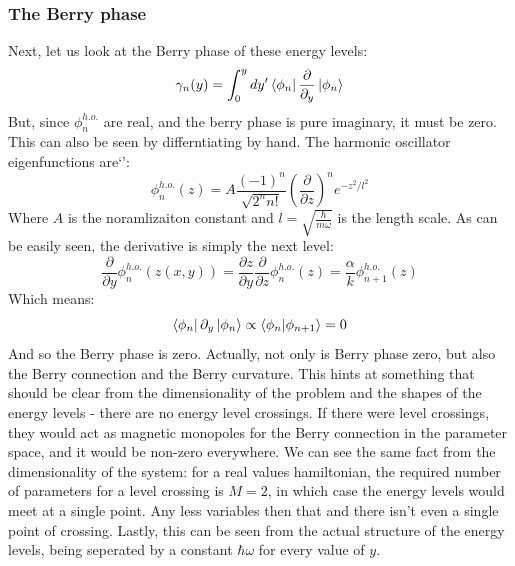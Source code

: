 \documentclass{article}
\begin{document}
\subsubsection{The Berry phase}
Next, let us look at the Berry phase of these energy levels:
\begin{equation}
    \gamma_n(y) = \int_0^y dy' \bra{\phi_n} \frac{\partial}{\partial_y} \ket{\phi_n}
\end{equation}
But, since $\phi_n^{h.o.}$ are real, and the berry phase is pure imaginary, it must be zero. This can also be seen by differntiating by hand. The harmonic oscillator eigenfunctions are`':
\begin{equation}
    \phi_n^{h.o.}(z) = A \frac{(-1)^n}{\sqrt{2^n n!}} \left(\frac{\partial}{\partial z}\right)^n e^{-z^2 / l^2}
\end{equation}
Where $A$ is the noramlizaiton constant and $l = \sqrt{\frac{\hbar}{m\omega}}$ is the length scale. As can be easily seen, the derivative is simply the next level:
\begin{equation}
    \frac{\partial}{\partial y} \phi_n^{h.o.}(z(x, y)) = 
    \frac{\partial z}{\partial y} \frac{\partial}{\partial z} \phi_n^{h.o.}(z) = \frac{\alpha}{k} \phi_{n+1}^{h.o.}(z)
\end{equation}
Which means:
\begin{equation}
    \bra{\phi_n} \partial_y \ket{\phi_n} \propto \braket{\phi_n}{\phi_{n+1}} = 0
\end{equation}
And so the Berry phase is zero. Actually, not only is Berry phase zero, but also the Berry connection and the Berry curvature. This hints at something that should be clear from the dimensionality of the problem and the shapes of the energy levels - there are no energy level crossings. If there were level crossings, they would act as magnetic monopoles for the Berry connection in the parameter space, and it would be non-zero everywhere.
\newline
We can see the same fact from the dimensionality of the system: for a real values hamiltonian, the required number of parameters for a level crossing is $M = 2$, in which case the energy levels would meet at a single point. Any less variables then that and there isn't even a single point of crossing. Lastly, this can be seen from the actual structure of the energy levels, being seperated by a constant $\hbar \omega$ for every value of $y$.
\end{document}
